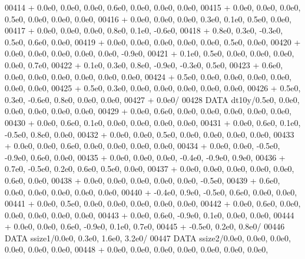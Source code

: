 \begin{DoxyCode}
00414      +                  0.0e0, 0.0e0, 0.0e0, 0.6e0, 0.0e0, 0.0e0, 0.0e0,
00415      +                  0.0e0, 0.0e0, 0.0e0, 0.5e0, 0.0e0, 0.0e0, 0.0e0,
00416      +                  0.0e0, 0.0e0, 0.0e0, 0.3e0, 0.1e0, 0.5e0, 0.0e0,
00417      +                  0.0e0, 0.0e0, 0.0e0, 0.8e0, 0.1e0, -0.6e0,
00418      +                  0.8e0, 0.3e0, -0.3e0, 0.5e0, 0.6e0, 0.0e0,
00419      +                  0.0e0, 0.0e0, 0.0e0, 0.0e0, 0.0e0, 0.5e0, 0.0e0,
00420      +                  0.0e0, 0.0e0, 0.0e0, 0.0e0, 0.0e0, -0.9e0,
00421      +                  0.1e0, 0.5e0, 0.0e0, 0.0e0, 0.0e0, 0.0e0, 0.7e0,
00422      +                  0.1e0, 0.3e0, 0.8e0, -0.9e0, -0.3e0, 0.5e0,
00423      +                  0.6e0, 0.0e0, 0.0e0, 0.0e0, 0.0e0, 0.0e0, 0.0e0,
00424      +                  0.5e0, 0.0e0, 0.0e0, 0.0e0, 0.0e0, 0.0e0, 0.0e0,
00425      +                  0.5e0, 0.3e0, 0.0e0, 0.0e0, 0.0e0, 0.0e0, 0.0e0,
00426      +                  0.5e0, 0.3e0, -0.6e0, 0.8e0, 0.0e0, 0.0e0,
00427      +                  0.0e0/
00428       \textcolor{keyword}{DATA}              dt10y/0.5e0, 0.0e0, 0.0e0, 0.0e0, 0.0e0, 0.0e0,
00429      +                  0.0e0, 0.6e0, 0.0e0, 0.0e0, 0.0e0, 0.0e0, 0.0e0,
00430      +                  0.0e0, 0.6e0, 0.1e0, 0.0e0, 0.0e0, 0.0e0, 0.0e0,
00431      +                  0.0e0, 0.6e0, 0.1e0, -0.5e0, 0.8e0, 0.0e0,
00432      +                  0.0e0, 0.0e0, 0.5e0, 0.0e0, 0.0e0, 0.0e0, 0.0e0,
00433      +                  0.0e0, 0.0e0, 0.6e0, 0.0e0, 0.0e0, 0.0e0, 0.0e0,
00434      +                  0.0e0, 0.0e0, -0.5e0, -0.9e0, 0.6e0, 0.0e0,
00435      +                  0.0e0, 0.0e0, 0.0e0, -0.4e0, -0.9e0, 0.9e0,
00436      +                  0.7e0, -0.5e0, 0.2e0, 0.6e0, 0.5e0, 0.0e0,
00437      +                  0.0e0, 0.0e0, 0.0e0, 0.0e0, 0.0e0, 0.6e0, 0.0e0,
00438      +                  0.0e0, 0.0e0, 0.0e0, 0.0e0, 0.0e0, -0.5e0,
00439      +                  0.6e0, 0.0e0, 0.0e0, 0.0e0, 0.0e0, 0.0e0,
00440      +                  -0.4e0, 0.9e0, -0.5e0, 0.6e0, 0.0e0, 0.0e0,
00441      +                  0.0e0, 0.5e0, 0.0e0, 0.0e0, 0.0e0, 0.0e0, 0.0e0,
00442      +                  0.0e0, 0.6e0, 0.0e0, 0.0e0, 0.0e0, 0.0e0, 0.0e0,
00443      +                  0.0e0, 0.6e0, -0.9e0, 0.1e0, 0.0e0, 0.0e0,
00444      +                  0.0e0, 0.0e0, 0.6e0, -0.9e0, 0.1e0, 0.7e0,
00445      +                  -0.5e0, 0.2e0, 0.8e0/
00446       \textcolor{keyword}{DATA}              ssize1/0.0e0, 0.3e0, 1.6e0, 3.2e0/
00447       \textcolor{keyword}{DATA}              ssize2/0.0e0, 0.0e0, 0.0e0, 0.0e0, 0.0e0, 0.0e0,
00448      +                  0.0e0, 0.0e0, 0.0e0, 0.0e0, 0.0e0, 0.0e0, 0.0e0,

\end{DoxyCode}

